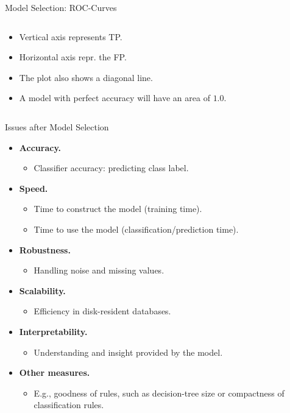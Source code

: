 \begin{frame}{Model Selection: ROC-Curves}
\begin{columns}
\begin{column}{0.4\textwidth}
			\begin{itemize}
				\item Vertical axis represents TP.
				\item Horizontal axis repr. the FP.
				\item The plot also shows a diagonal line.
				\item A model with perfect accuracy will have an area of $1.0$.
			\end{itemize}
		\end{column}
	\end{columns}
\end{frame}

\begin{frame}{Issues after Model Selection}
	\begin{itemize}
		\item \textbf{Accuracy.}
		      \begin{itemize}
			      \item Classifier accuracy: predicting class label.
		      \end{itemize}
		\item \textbf{Speed.}
		      \begin{itemize}
			      \item Time to construct the model (training time).
			      \item Time to use the model (classification/prediction time).
		      \end{itemize}
		\item \textbf{Robustness.}
		      \begin{itemize}
			      \item Handling noise and missing values.
		      \end{itemize}
		\item \textbf{Scalability.}
		      \begin{itemize}
			      \item Efficiency in disk-resident databases.
		      \end{itemize}
		\item \textbf{Interpretability.}
		      \begin{itemize}
			      \item Understanding and insight provided by the model.
		      \end{itemize}
		\item \textbf{Other measures.}
		      \begin{itemize}
			      \item E.g., goodness of rules, such as decision-tree size or compactness of classification rules.
		      \end{itemize}
	\end{itemize}
\end{frame}
